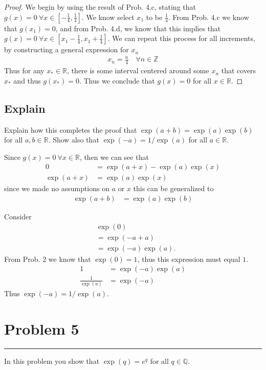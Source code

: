 \documentclass[12pt]{amsart}
\newcommand{\usec}[1]{%
\section*{#1}%
\noindent\rule{\textwidth}{2pt}%
\vspace{10pt}%
}
\newcommand{\prob}[1]{Prob. #1}
\newcommand{\R}{\mathbb{R}}
\newcommand{\Z}{\mathbb{Z}}
\newcommand{\Q}{\mathbb{Q}}
\begin{document}
\begin{proof}
  We begin by using the result of \prob{4.c}, stating that $g(x)=0\ \forall
  x\in\left[-\frac{1}{4},\frac{1}{4}\right]$. We know select $x_1$ to be
  $\frac{1}{4}$. From \prob{4.c} we know that $g(x_1)=0$, and from \prob{4.d},
  we know that this implies that $g(x)=0\ \forall
  x\in\left[x_1-\frac{1}{4},x_1+\frac{1}{4}\right]$. We can repeat this process
  for all increments, by constructing a general expression for $x_n$
  \begin{align*}
    x_n=\frac{n}{4}\quad\forall n\in\Z
  \end{align*}
  Thus for any $x_*\in\R$, there is some interval centered around some $x_n$
  that covers $x_*$ and thus $g(x_*)=0$. Thus we conclude that $g(x)=0$ for all
  $x\in\R$.
\end{proof}

\subsection*{Explain}%
\label{sub:explain}

Explain how this completes the proof that $\exp(a+b)=\exp(a)\exp(b)$ for all
$a,b\in\R$. Show also that $\exp(-a)=1/\exp(a)$ for all $a\in\R$.

Since $g(x)=0\ \forall x\in\R$, then we can see that
\begin{align*}
  0&=\exp(a+x)-\exp(a)\exp(x)\\
  \exp(a+x)&=\exp(a)\exp(x)
\end{align*}
since we made no assumptions on $a$ or $x$ this can be generalized to
\begin{align*}
  \exp(a+b)&=\exp(a)\exp(b)
\end{align*}

Consider
\begin{align*}
  &\exp(0)\\
  &=\exp(-a+a)\\
  &=\exp(-a)\exp(a).
\end{align*}
From \prob{2} we know that $\exp(0)=1$, thus this expression must equal $1$.
\begin{align*}
  1&=\exp(-a)\exp(a)\\
  \frac{1}{\exp(a)}&=\exp(-a)
\end{align*}
Thus $\exp(-a)=1/\exp(a)$.

\usec{Problem 5}%
\label{sec:problem_5}

In this problem you show that $\exp(q)=e^q$ for all $q\in\Q$.
\end{document}
